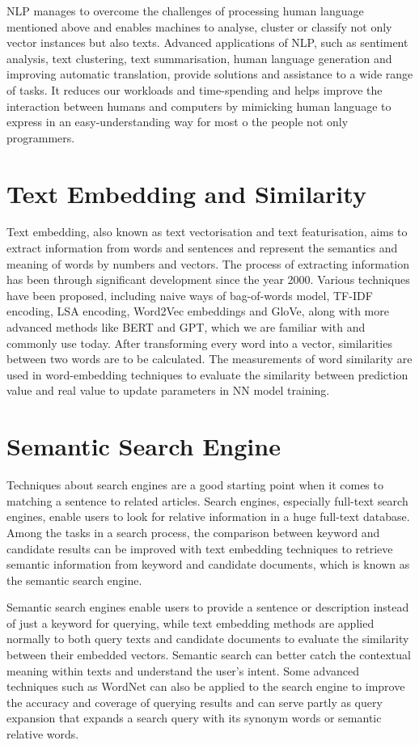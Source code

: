 NLP manages to overcome the challenges of processing human language mentioned above and enables machines to analyse, cluster or classify not only vector instances but also texts. 
Advanced applications of NLP, such as sentiment analysis, text clustering, text summarisation, human language generation and improving automatic translation, provide solutions and assistance to a wide range of tasks. 
It reduces our workloads and time-spending and helps improve the interaction between humans and computers by mimicking human language to express in an easy-understanding way for most o the people not only programmers.

\section{Text Embedding and Similarity}
Text embedding, also known as text vectorisation and text featurisation, aims to extract information from words and sentences and represent the semantics and meaning of words by numbers and vectors.
The process of extracting information has been through significant development since the year 2000.
Various techniques have been proposed, including naive ways of bag-of-words model, TF-IDF encoding, LSA encoding, Word2Vec embeddings and GloVe, along with more advanced methods like BERT and GPT, which we are familiar with and commonly use today.
After transforming every word into a vector, similarities between two words are to be calculated.
The measurements of word similarity are used in word-embedding techniques to evaluate the similarity between prediction value and real value to update parameters in NN model training.

\section{Semantic Search Engine}
Techniques about search engines are a good starting point when it comes to matching a sentence to related articles.
Search engines, especially full-text search engines, enable users to look for relative information in a huge full-text database.
Among the tasks in a search process, the comparison between keyword and candidate results can be improved with text embedding techniques to retrieve semantic information from keyword and candidate documents, which is known as the semantic search engine.

Semantic search engines enable users to provide a sentence or description instead of just a keyword for querying, while text embedding methods are applied normally to both query texts and candidate documents to evaluate the similarity between their embedded vectors.
Semantic search can better catch the contextual meaning within texts and understand the user's intent.
Some advanced techniques such as WordNet can also be applied to the search engine to improve the accuracy and coverage of querying results and can serve partly as query expansion that expands a search query with its synonym words or semantic relative words.


